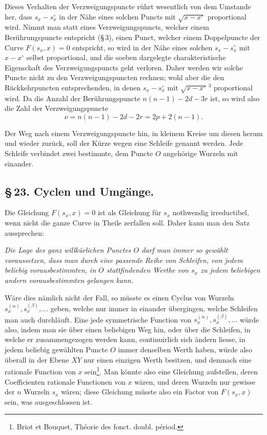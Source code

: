 \documentclass[10pt]{article}
\begin{document}
Dieses Verhalten der Verzweigungspuncte rührt wesentlich von dem Umstande her, dass \(s_x-s_x^\circ\) in der Nähe eines solchen Puncts mit \(\sqrt{x-x^\circ}\) proportional wird. Nimmt man statt eines Verzweigungspuncts, welcher einem Berührungspuncte entspricht (\S\,3), einen Punct, welcher einem Doppelpuncte der Curve \(F(s_x,x)=0\) entspricht, so wird in der Nähe eines solchen \(s_x-s_x^\circ\) mit \(x-x^\circ\) selbst proportional, und die soeben dargelegte charakteristische Eigenschaft des Verzweigungspuncts geht verloren. Daher werden wir solche Puncte nicht zu den Verzweigungspuncten rechnen; wohl aber die den Rückkehrpuncten entsprechenden, in denen \(s_x-s_x^\circ\) mit \(\sqrt{x-x^\circ}^{\,3}\) proportional wird. Da die Anzahl der Berührungspuncte \(n(n-1)-2d-3r\) ist, so wird also die Zahl der Verzweigungspuncte
\[
\nu=n(n-1)-2d-2r=2p+2(n-1).
\]

Der Weg nach einem Verzweigungspuncte hin, in kleinem Kreise um diesen herum und wieder zurück, soll der Kürze wegen eine Schleife genannt werden. Jede Schleife verbindet zwei bestimmte, dem Puncte \(O\) angehörige Wurzeln mit einander.

\subsection*{\S\,23. Cyclen und Umgänge.}

Die Gleichung \(F(s_x,x)=0\) ist als Gleichung für \(s_x\) nothwendig irreductibel, wenn nicht die ganze Curve in Theile zerfallen soll. Daher kann man den Satz aussprechen:

\emph{Die Lage des ganz willkürlichen Punctes \(O\) darf man immer so gewählt voraussetzen, dass man durch eine passende Reihe von Schleifen, von jedem beliebig vorausbestimmten, in \(O\) stattfindenden Werthe von \(s_x\) zu jedem beliebigen andern vorausbestimmten gelangen kann.}

Wäre dies nämlich nicht der Fall, so müsste es einen Cyclus von Wurzeln \(s_x^{(\alpha)},s_x^{(\beta)},\ldots\) geben, welche nur immer in einander übergingen, welche Schleifen man auch durchläuft. Eine jede symmetrische Function von \(s_x^{(\alpha)},s_x^{(\beta)},\ldots\) würde also, indem man sie über einen beliebigen Weg hin, oder über die Schleifen, in welche er zusammengezogen werden kann, continuirlich sich ändern liesse, in jedem beliebig gewählten Puncte \(O\) immer denselben Werth haben, würde also überall in der Ebene \(XY\) nur einen einzigen Werth besitzen, und demnach eine rationale Function von \(x\) sein\footnote{Briot et Bouquet, Théorie des fonct. doubl. périod.}. Man könnte also eine Gleichung aufstellen, deren Coefficienten rationale Functionen von \(x\) wären, und deren Wurzeln nur gewisse der \(n\) Wurzeln \(s_x\) wären; diese Gleichung müsste also ein Factor von \(F(s_x,x)\) sein, was ausgeschlossen ist.
\end{document}
